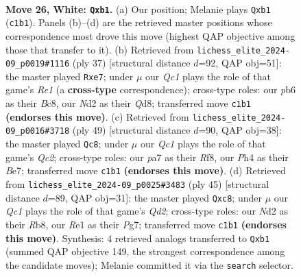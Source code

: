 \documentclass[11pt]{article}
\begin{document}
\clearpage

\begin{figure}[p]\centering
\begin{subfigure}{0.46\textwidth}\centering
\resizebox{\linewidth}{!}{%
\newchessgame
\chessboard[
  setfen={rqb1k2r/p3b1pp/1p6/n2p1p2/P2P3P/4P1PB/1B1N2K1/1rQ1R3 w - - 0 26},
  showmover=false,
  pgfstyle=straightmove, color=movearrow, markmove={c1-b1}
]}
\caption{}
\end{subfigure}\hfill
\begin{subfigure}{0.46\textwidth}\centering
\resizebox{\linewidth}{!}{%
\newchessgame
\chessboard[
  setfen={2bqr1k1/4R1bp/1pp2pp1/p1p5/P4B2/3P1N1P/1PPQ1PP1/R5K1 b - - 0 19},
  showmover=false,
  pgfstyle=straightmove, color=movearrow, markmove={e8-e7}
]}
\caption{}
\end{subfigure}
\\[4pt]
\begin{subfigure}{0.46\textwidth}\centering
\resizebox{\linewidth}{!}{%
\newchessgame
\chessboard[
  setfen={5rk1/1bq1b2p/n2p2p1/B2Ppp2/2P3P1/1Q4NP/5PB1/R5K1 b - - 1 25},
  showmover=false,
  pgfstyle=straightmove, color=movearrow, markmove={c7-c8}
]}
\caption{}
\end{subfigure}\hfill
\begin{subfigure}{0.46\textwidth}\centering
\resizebox{\linewidth}{!}{%
\newchessgame
\chessboard[
  setfen={1rR3k1/3qn1pp/1p2bp2/p3p3/N7/P2PPBP1/1Q3P1P/R5K1 b - - 0 23},
  showmover=false,
  pgfstyle=straightmove, color=movearrow, markmove={d7-c8}
]}
\caption{}
\end{subfigure}
\caption{\textbf{Move 26, White: \texttt{Qxb1}.} (a) Our position; Melanie plays \texttt{Qxb1} (\texttt{c1b1}). Panels (b)--(d) are the retrieved master positions whose correspondence most drove this move (highest QAP objective among those that transfer to it). (b) Retrieved from \texttt{lichess\_elite\_2024-09\_p0019\#1116} (ply 37) [structural distance $d$=92, QAP obj=51]: the master played \texttt{Rxe7}; under $\mu$ our \emph{Qc1} plays the role of that game's \emph{Re1} (a \textbf{cross-type} correspondence); cross-type roles: our \emph{p}b6 as their \emph{B}c8, our \emph{N}d2 as their \emph{Q}d8; transferred move \texttt{c1b1} \textbf{(endorses this move)}. (c) Retrieved from \texttt{lichess\_elite\_2024-09\_p0016\#3718} (ply 49) [structural distance $d$=90, QAP obj=38]: the master played \texttt{Qc8}; under $\mu$ our \emph{Qc1} plays the role of that game's \emph{Qc2}; cross-type roles: our \emph{p}a7 as their \emph{R}f8, our \emph{P}h4 as their \emph{B}e7; transferred move \texttt{c1b1} \textbf{(endorses this move)}. (d) Retrieved from \texttt{lichess\_elite\_2024-09\_p0025\#3483} (ply 45) [structural distance $d$=89, QAP obj=31]: the master played \texttt{Qxc8}; under $\mu$ our \emph{Qc1} plays the role of that game's \emph{Qd2}; cross-type roles: our \emph{N}d2 as their \emph{R}b8, our \emph{R}e1 as their \emph{P}g7; transferred move \texttt{c1b1} \textbf{(endorses this move)}. Synthesis: 4 retrieved analogs transferred to \texttt{Qxb1} (summed QAP objective 149, the strongest correspondence among the candidate moves); Melanie committed it via the \texttt{search} selector.}
\label{fig:thought-m50}
\end{figure}
\end{document}
